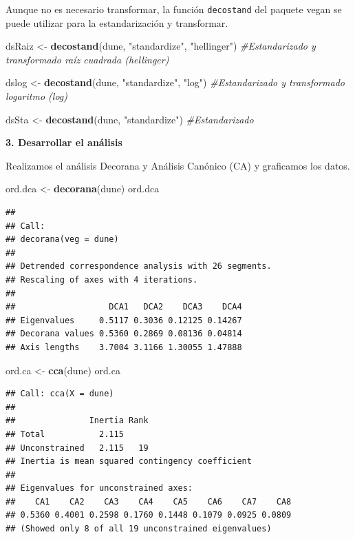 \documentclass[]{book}
\newenvironment{Shaded}{\begin{snugshade}}{\end{snugshade}}
\newcommand{\KeywordTok}[1]{\textcolor[rgb]{0.13,0.29,0.53}{\textbf{{#1}}}}
\newcommand{\StringTok}[1]{\textcolor[rgb]{0.31,0.60,0.02}{{#1}}}
\newcommand{\CommentTok}[1]{\textcolor[rgb]{0.56,0.35,0.01}{\textit{{#1}}}}
\newcommand{\NormalTok}[1]{{#1}}
\begin{document}
Aunque no es necesario transformar, la función \texttt{decostand} del
paquete vegan se puede utilizar para la estandarización y transformar.

\begin{Shaded}
\begin{Highlighting}[]
\NormalTok{dsRaiz <-}\StringTok{ }\KeywordTok{decostand}\NormalTok{(dune, }\StringTok{"standardize"}\NormalTok{, }\StringTok{"hellinger"}\NormalTok{) }
\CommentTok{#Estandarizado y transformado raíz cuadrada (hellinger)}

\NormalTok{dslog <-}\StringTok{ }\KeywordTok{decostand}\NormalTok{(dune, }\StringTok{"standardize"}\NormalTok{, }\StringTok{"log"}\NormalTok{) }
\CommentTok{#Estandarizado y transformado logaritmo (log)}

\NormalTok{dsSta <-}\StringTok{ }\KeywordTok{decostand}\NormalTok{(dune, }\StringTok{"standardize"}\NormalTok{)}
\CommentTok{#Estandarizado}
\end{Highlighting}
\end{Shaded}

\textbf{3. Desarrollar el análisis}

Realizamos el análisis Decorana y Análisis Canónico (CA) y graficamos
los datos.

\begin{Shaded}
\begin{Highlighting}[]
\NormalTok{ord.dca <-}\StringTok{ }\KeywordTok{decorana}\NormalTok{(dune)}
\NormalTok{ord.dca}
\end{Highlighting}
\end{Shaded}

\begin{verbatim}
## 
## Call:
## decorana(veg = dune) 
## 
## Detrended correspondence analysis with 26 segments.
## Rescaling of axes with 4 iterations.
## 
##                   DCA1   DCA2    DCA3    DCA4
## Eigenvalues     0.5117 0.3036 0.12125 0.14267
## Decorana values 0.5360 0.2869 0.08136 0.04814
## Axis lengths    3.7004 3.1166 1.30055 1.47888
\end{verbatim}

\begin{Shaded}
\begin{Highlighting}[]
\NormalTok{ord.ca <-}\StringTok{ }\KeywordTok{cca}\NormalTok{(dune)}
\NormalTok{ord.ca}
\end{Highlighting}
\end{Shaded}

\begin{verbatim}
## Call: cca(X = dune)
## 
##               Inertia Rank
## Total           2.115     
## Unconstrained   2.115   19
## Inertia is mean squared contingency coefficient 
## 
## Eigenvalues for unconstrained axes:
##    CA1    CA2    CA3    CA4    CA5    CA6    CA7    CA8 
## 0.5360 0.4001 0.2598 0.1760 0.1448 0.1079 0.0925 0.0809 
## (Showed only 8 of all 19 unconstrained eigenvalues)
\end{verbatim}
\end{document}
